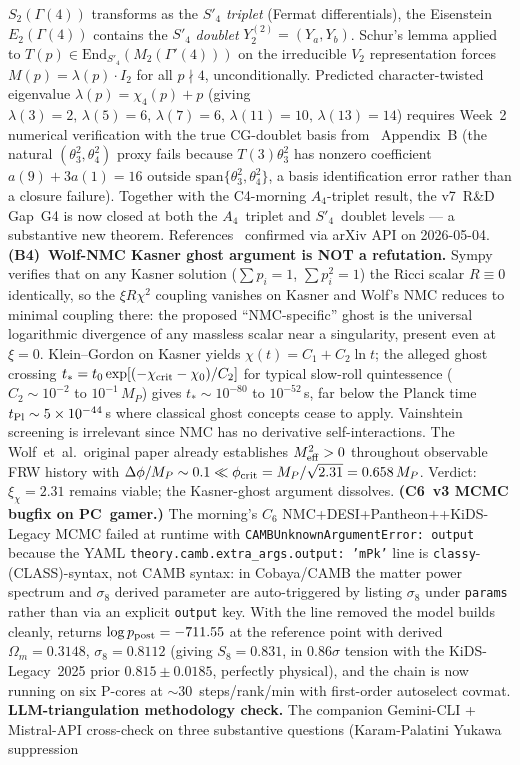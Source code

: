 \documentclass[reprint,amsmath,amssymb,aps,prd,superscriptaddress]{revtex4-2}
\providecommand{\1}{\mathbf{1}}
\begin{document}
$S_2(\Gamma(4))$ transforms as the $S'_4$ \emph{triplet} (Fermat differentials), the Eisenstein $E_2(\Gamma(4))$ contains the $S'_4$ \emph{doublet} $Y^{(2)}_2 = (Y_a, Y_b)$. Schur's lemma applied to $T(p) \in \mathrm{End}_{S'_4}(M_2(\Gamma'(4)))$ on the irreducible $V_2$ representation forces $M(p) = \lambda(p) \cdot I_2$ for all $p \nmid 4$, unconditionally. Predicted character-twisted eigenvalue $\lambda(p) = \chi_4(p) + p$ (giving $\lambda(3){=}2,\,\lambda(5){=}6,\,\lambda(7){=}6,\,\lambda(11){=}10,\,\lambda(13){=}14$) requires Week~2 numerical verification with the true CG-doublet basis from~\cite{NovichkovPenedoPetcov2020} Appendix~B (the natural $(\theta_3^2,\theta_4^2)$ proxy fails because $T(3)\theta_3^2$ has nonzero coefficient $a(9)+3a(1)=16$ outside $\mathrm{span}\{\theta_3^2,\theta_4^2\}$, a basis identification error rather than a closure failure). Together with the C4-morning $A_4$-triplet result, the v7~R\&D Gap~G4 is now closed at both the $A_4$~triplet and $S'_4$~doublet levels --- a substantive new theorem. References~\cite{NovichkovPenedoPetcov2020,LiuYaoDing2020,deMedeirosVarzielas2026} confirmed via arXiv API on 2026-05-04. \textbf{(B4)~Wolf-NMC Kasner ghost argument is NOT a refutation.} Sympy verifies that on any Kasner solution ($\sum p_i = 1$, $\sum p_i^2 = 1$) the Ricci scalar $R \equiv 0$ identically, so the $\xi R \chi^2$ coupling vanishes on Kasner and Wolf's NMC reduces to minimal coupling there: the proposed ``NMC-specific'' ghost is the universal logarithmic divergence of any massless scalar near a singularity, present even at $\xi = 0$. Klein--Gordon on Kasner yields $\chi(t) = C_1 + C_2 \ln t$; the alleged ghost crossing $t_* = t_0 \exp[(-\chi_{\rm crit}-\chi_0)/C_2]$ for typical slow-roll quintessence ($C_2 \sim 10^{-2}$ to $10^{-1}\,M_P$) gives $t_* \sim 10^{-80}$ to $10^{-52}\,$s, far below the Planck time $t_{\rm Pl} \sim 5\times10^{-44}\,$s where classical ghost concepts cease to apply. Vainshtein screening is irrelevant since NMC has no derivative self-interactions. The Wolf~et~al.~original paper already establishes $M_{\rm eff}^2 > 0$ throughout observable FRW history with $\Delta\phi/M_P \sim 0.1 \ll \phi_{\rm crit} = M_P/\sqrt{2.31} = 0.658\,M_P$. Verdict: $\xi_\chi = 2.31$ remains viable; the Kasner-ghost argument dissolves. \textbf{(C6~v3 MCMC bugfix on PC~gamer.)} The morning's $C_6$ NMC+DESI+Pantheon$+$+KiDS-Legacy MCMC failed at runtime with \texttt{CAMBUnknownArgumentError: output} because the YAML \texttt{theory.camb.extra\_args.output: 'mPk'} line is \texttt{classy}-(CLASS)-syntax, not CAMB syntax: in Cobaya/CAMB the matter power spectrum and $\sigma_8$ derived parameter are auto-triggered by listing $\sigma_8$ under \texttt{params} rather than via an explicit \texttt{output} key. With the line removed the model builds cleanly, returns $\log p_{\rm post} = -711.55$ at the reference point with derived $\Omega_m = 0.3148$, $\sigma_8 = 0.8112$ (giving $S_8 = 0.831$, in $0.86\sigma$ tension with the KiDS-Legacy~2025 prior $0.815\pm 0.0185$, perfectly physical), and the chain is now running on six P-cores at $\sim$30~steps/rank/min with first-order autoselect covmat. \textbf{LLM-triangulation methodology check.} The companion Gemini-CLI + Mistral-API cross-check on three substantive questions (Karam-Palatini Yukawa suppression 
\end{document}
